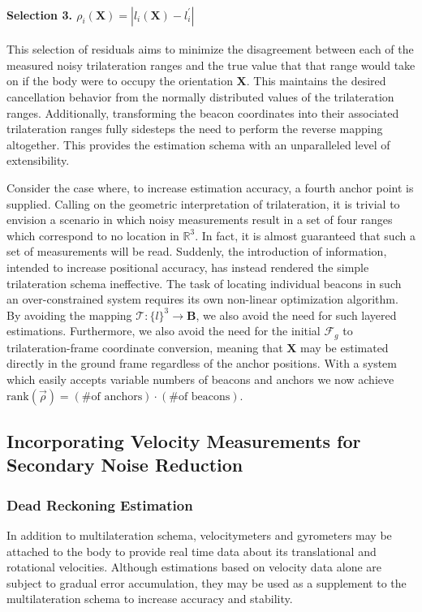\documentclass{report}
\begin{document}
					\paragraph{Selection 3. $\rho_i\left(\mathbf{X}\right)=\left|l_i\left(\mathbf{X}\right)-{l^\prime_i}\right|$} This selection of residuals aims to minimize the disagreement between each of the measured noisy trilateration ranges and the true value that that range would take on if the body were to occupy the orientation $\mathbf{X}$. This maintains the desired cancellation behavior from the normally distributed values of the trilateration ranges. Additionally, transforming the beacon coordinates into their associated trilateration ranges fully sidesteps the need to perform the reverse mapping altogether. This provides the estimation schema with an unparalleled level of extensibility.\par
					Consider the case where, to increase estimation accuracy, a fourth anchor point is supplied. Calling on the geometric interpretation of trilateration, it is trivial to envision a scenario in which noisy measurements result in a set of four ranges which correspond to no location in $\mathbb{R}^3$. In fact, it is almost guaranteed that such a set of measurements will be read. Suddenly, the introduction of information, intended to increase positional accuracy, has instead rendered the simple trilateration schema ineffective. The task of locating individual beacons in such an over-constrained system requires its own non-linear optimization algorithm. By avoiding the mapping $\mathcal{T}:\{l\}^3\to\mathbf{B}$, we also avoid the need for such layered estimations. Furthermore, we also avoid the need for the initial $\mathcal{F}_g$ to trilateration-frame coordinate conversion, meaning that $\mathbf{X}$ may be estimated directly in the ground frame regardless of the anchor positions. With a system which easily accepts variable numbers of beacons and anchors we now achieve $\text{rank}\left(\vec\rho\right)=\left(\text{\# of anchors}\right)\cdot\left(\text{\# of beacons}\right)$.
			\subsection{Incorporating Velocity Measurements for Secondary Noise Reduction}
				\subsubsection{Dead Reckoning Estimation}
					In addition to multilateration schema, velocitymeters and gyrometers may be attached to the body to provide real time data about its translational and rotational velocities. Although estimations based on velocity data alone are subject to gradual error accumulation, they may be used as a supplement to the multilateration schema to increase accuracy and stability.
\end{document}
